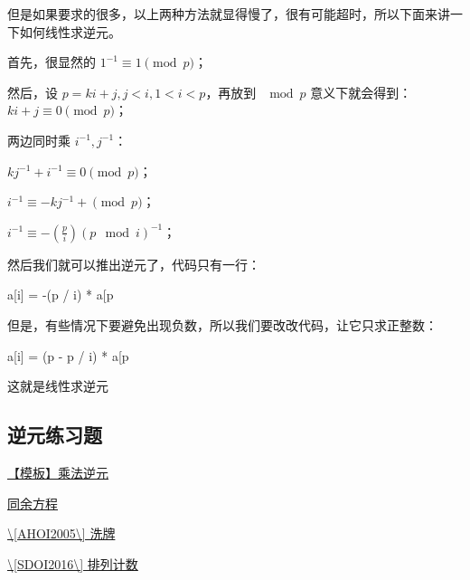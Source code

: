 但是如果要求的很多，以上两种方法就显得慢了，很有可能超时，所以下面来讲一下如何线性求逆元。

首先，很显然的 $1^{-1} \equiv 1 \pmod p$；

然后，设 $p=ki+j,j<i,1<i<p$，再放到 $\mod p$ 意义下就会得到：$ki+j \equiv 0 \pmod p$；

两边同时乘 $i^{-1},j^{-1}$：

$kj^{-1}+i^{-1} \equiv 0 \pmod p$；

$i^{-1} \equiv -kj^{-1}+ \pmod p$；

$i^{-1} \equiv -(\frac{p}{i}) (p \mod i)^{-1}$；

然后我们就可以推出逆元了，代码只有一行：

\begin{cppcode}
a[i] = -(p / i) * a[p %
\end{cppcode}

但是，有些情况下要避免出现负数，所以我们要改改代码，让它只求正整数：

\begin{cppcode}
a[i] = (p - p / i) * a[p %
\end{cppcode}

这就是线性求逆元

\subsection{逆元练习题}

\href{https://www.luogu.org/problemnew/show/P3811}{【模板】乘法逆元}

\href{https://www.luogu.org/problemnew/show/P1082}{同余方程}

\href{https://www.lydsy.com/JudgeOnline/problem.php?id=1965}{\textbackslash{}[AHOI2005\textbackslash{}] 洗牌}

\href{https://www.luogu.org/problemnew/show/P4071}{\textbackslash{}[SDOI2016\textbackslash{}] 排列计数}
